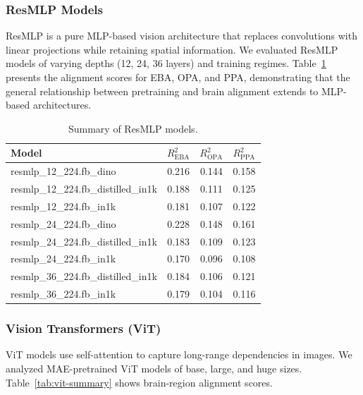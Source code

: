 \documentclass{article}
\theoremstyle{plain}
\theoremstyle{definition}
\theoremstyle{remark}
\begin{document}
\subsubsection{ResMLP Models}
\label{supple:resmlp}

ResMLP is a pure MLP-based vision architecture that replaces convolutions with linear projections while retaining spatial information. We evaluated ResMLP models of varying depths (12, 24, 36 layers) and training regimes. Table~\ref{tab:resmlp-summary} presents the alignment scores for EBA, OPA, and PPA, demonstrating that the general relationship between pretraining and brain alignment extends to MLP-based architectures.



\begin{table}[!t]
\caption{Summary of ResMLP models.}
\label{tab:resmlp-summary}
\centering
\small
\setlength{\tabcolsep}{6pt}
\renewcommand{\arraystretch}{1.15}
\begin{tabular}{lccc}
\toprule
Model & $R^2_{\text{EBA}}$ & $R^2_{\text{OPA}}$ & $R^2_{\text{PPA}}$ \\
\midrule
resmlp\_12\_224.fb\_dino              & 0.216 & 0.144 & 0.158 \\
resmlp\_12\_224.fb\_distilled\_in1k   & 0.188 & 0.111 & 0.125 \\
resmlp\_12\_224.fb\_in1k              & 0.181 & 0.107 & 0.122 \\
resmlp\_24\_224.fb\_dino              & 0.228 & 0.148 & 0.161 \\
resmlp\_24\_224.fb\_distilled\_in1k   & 0.183 & 0.109 & 0.123 \\
resmlp\_24\_224.fb\_in1k              & 0.170 & 0.096 & 0.108 \\
resmlp\_36\_224.fb\_distilled\_in1k   & 0.184 & 0.106 & 0.121 \\
resmlp\_36\_224.fb\_in1k              & 0.179 & 0.104 & 0.116 \\
\bottomrule
\end{tabular}
\end{table}


\subsubsection{Vision Transformers (ViT)}
\label{supple:vit}

ViT models use self-attention to capture long-range dependencies in images. We analyzed MAE-pretrained ViT models of base, large, and huge sizes. Table~\ref{tab:vit-summary} shows brain-region alignment scores. 
\end{document}
